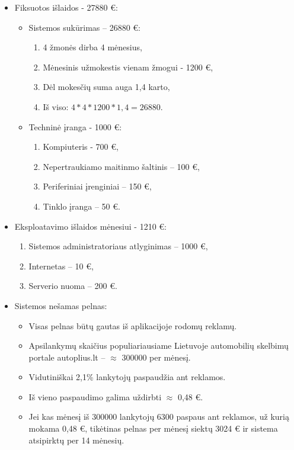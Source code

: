 \documentclass[12pt]{article}
\begin{document}
	\begin{itemize}
	\item{Fiksuotos išlaidos - 27880 €:}
	\begin{itemize}
	\item{Sistemos sukūrimas – 26880 €:}
	
	\begin{enumerate}
		\item{4 žmonės dirba 4 mėnesius,}
		\item{Mėnesinis užmokestis vienam žmogui - 1200 €,}
		\item{Dėl mokesčių suma auga 1,4 karto,}
		\item{Iš viso: $4*4*1200*1,4=26880$.}
	\end{enumerate}
	
	\item{Techninė įranga - 1000 €:}
	\begin{enumerate}
		\item{Kompiuteris - 700 €,}
		\item{Nepertraukiamo maitinmo šaltinis – 100 €,}
		\item{Periferiniai įrenginiai – 150 €,}
		\item{Tinklo įranga – 50 €.}
	\end{enumerate}
	\end{itemize}
	
	\item{Eksploatavimo išlaidos mėnesiui - 1210 €:}
	\begin{enumerate}
		\item{Sistemos administratoriaus atlyginimas – 1000 €,}
		\item{Internetas – 10 €,}
		\item{Serverio nuoma – 200 €.}
	\end{enumerate}
	
	\item{Sistemos nešamas pelnas:}
	\begin{itemize}
		\item{Visas pelnas būtų gautas iš aplikacijoje rodomų reklamų.}
		\item{Apsilankymų skaičius populiariausiame Lietuvoje automobilių skelbimų portale autoplius.lt – $\approx$ 300000 per mėnesį.}
		\item{Vidutiniškai 2,1\% lankytojų paspaudžia ant reklamos.}
		\item{Iš vieno paspaudimo galima uždirbti $\approx$ 0,48 €.}
		\item{Jei kas mėnesį iš 300000 lankytojų 6300 paspaus ant reklamos, už kurią mokama 0,48 €, tikėtinas pelnas per mėnesį siektų 3024 € ir sistema atsipirktų per 14 mėnesių.}
	\end{itemize}
	\end{itemize}
	
\end{document}

